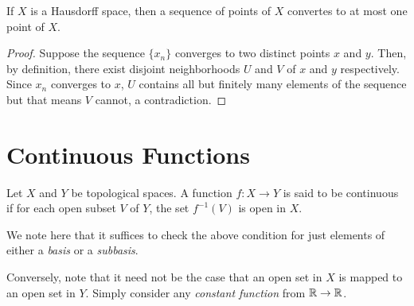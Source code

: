 \begin{theorem}
    If $X$ is a Hausdorff space, then a sequence of points of $X$ convertes to at most one point of $X$.
\end{theorem}
\begin{proof}
    Suppose the sequence $\{x_n\}$ converges to two distinct points $x$ and $y$. Then, by definition, there exist disjoint neighborhoods $U$ and $V$ of $x$ and $y$ respectively. Since $x_n$ converges to $x$, $U$ contains all but finitely many elements of the sequence but that means $V$ cannot, a contradiction.
\end{proof}


\section{Continuous Functions}
\begin{definition}[Continuity]
    Let $X$ and $Y$ be topological spaces. A function $f:X\to Y$ is said to be continuous if for each open subset $V$ of $Y$, the set $f^{-1}(V)$ is open in $X$.
\end{definition}

We note here that it suffices to check the above condition for just elements of either a \textit{basis} or a \textit{subbasis}.

\begin{mdframed}
    Conversely, note that it need not be the case that an open set in $X$ is mapped to an open set in $Y$. Simply consider any \textit{constant function} from $\mathbb{R}\to\mathbb{R}$.
\end{mdframed}

